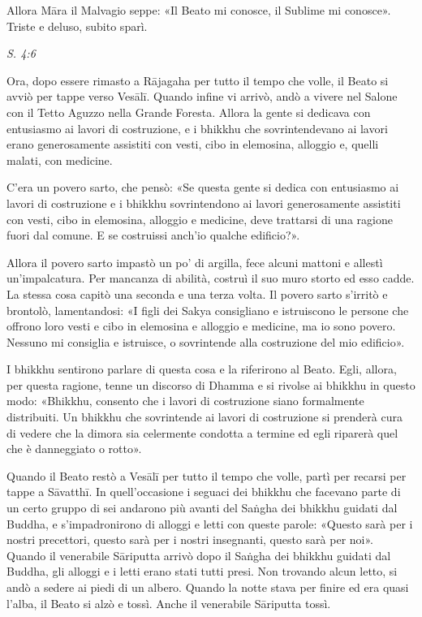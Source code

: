 Allora Māra il Malvagio seppe: «Il Beato mi conosce, il Sublime mi
conosce». Triste e deluso, subito sparì.


\emph{S. 4:6}


 Ora, dopo essere rimasto a Rājagaha per tutto il tempo che
volle, il Beato si avviò per tappe verso Vesālī. Quando infine vi
arrivò, andò a vivere nel Salone con il Tetto Aguzzo nella Grande
Foresta. Allora la gente si dedicava con entusiasmo ai lavori di
costruzione, e i bhikkhu che sovrintendevano ai lavori erano
generosamente assistiti con vesti, cibo in elemosina, alloggio e, quelli
malati, con medicine.


C’era un povero sarto, che pensò: «Se questa gente si dedica con
entusiasmo ai lavori di costruzione e i bhikkhu sovrintendono ai lavori
generosamente assistiti con vesti, cibo in elemosina, alloggio e
medicine, deve trattarsi di una ragione fuori dal comune. E se
costruissi anch’io qualche edificio?».


Allora il povero sarto impastò un po’ di argilla, fece alcuni mattoni e
allestì un’impalcatura. Per mancanza di abilità, costruì il suo muro
storto ed esso cadde. La stessa cosa capitò una seconda e una terza
volta. Il povero sarto s’irritò e brontolò, lamentandosi: «I figli dei
Sakya consigliano e istruiscono le persone che offrono loro vesti e cibo
in elemosina e alloggio e medicine, ma io sono povero. Nessuno mi
consiglia e istruisce, o sovrintende alla costruzione del mio edificio».


I bhikkhu sentirono parlare di questa cosa e la riferirono al Beato.
Egli, allora, per questa ragione, tenne un discorso di Dhamma e si
rivolse ai bhikkhu in questo modo: «Bhikkhu, consento che i lavori di
costruzione siano formalmente distribuiti. Un bhikkhu che sovrintende ai
lavori di costruzione si prenderà cura di vedere che la dimora sia
celermente condotta a termine ed egli riparerà quel che è danneggiato o
rotto».


Quando il Beato restò a Vesālī per tutto il tempo che volle, partì per
recarsi per tappe a Sāvatthī. In quell’occasione i seguaci dei bhikkhu
che facevano parte di un certo gruppo di sei andarono più avanti del
Saṅgha dei bhikkhu guidati dal Buddha, e s’impadronirono di alloggi e
letti con queste parole: «Questo sarà per i nostri precettori, questo
sarà per i nostri insegnanti, questo sarà per noi». Quando il venerabile
Sāriputta arrivò dopo il Saṅgha dei bhikkhu guidati dal Buddha, gli
alloggi e i letti erano stati tutti presi. Non trovando alcun letto, si
andò a sedere ai piedi di un albero. Quando la notte stava per finire ed
era quasi l’alba, il Beato si alzò e tossì. Anche il venerabile
Sāriputta tossì.


